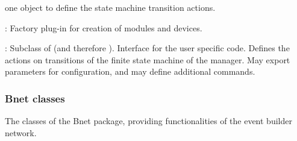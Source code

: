 \begin{compactdesc}
\begin{compactenum}
      one  object to define the state machine transition actions.
\end{compactenum}
\item[\class{dabc::Factory}] : Factory plug-in for creation of modules and devices.
\item[\class{dabc::ApplicationPlugin}] : Subclass of  
   (and therefore ). Interface for the user specific code. 
   Defines the actions on transitions of the finite state machine of the manager. 
   May export parameters for configuration, and may define additional commands.
\end{compactdesc}

\subsubsection{Bnet classes}
The classes of the Bnet package, providing functionalities of the event builder network.

